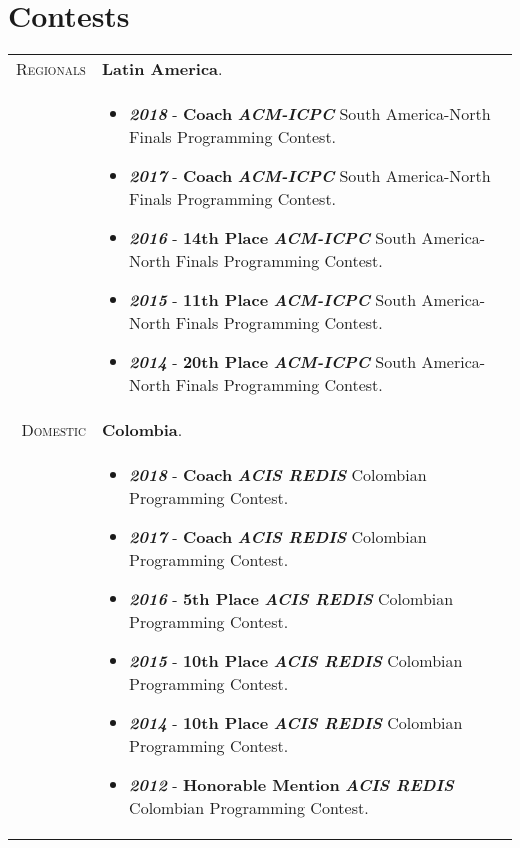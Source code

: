 \documentclass[a4paper,11pt]{article} %
\begin{document}
\section{Contests}
\begin{tabular}{r|p{12cm}}
\textsc{Regionals} & \textbf{Latin America}.\\
\newline
& \footnotesize{
\begin{itemize}
\item \textbf{\textit{2018}}  - \textbf{Coach} \textbf{\emph{ACM-ICPC}} South America-North Finals Programming Contest.
\item \textbf{\textit{2017}}  - \textbf{Coach} \textbf{\emph{ACM-ICPC}} South America-North Finals Programming Contest.
\item \textbf{\textit{2016}}  - \textbf{14th Place} \textbf{\emph{ACM-ICPC}} South America-North Finals Programming Contest.
\item \textbf{\textit{2015}}  - \textbf{11th Place} \textbf{\emph{ACM-ICPC}} South America-North Finals Programming Contest.
\item \textbf{\textit{2014}}  - \textbf{20th Place} \textbf{\emph{ACM-ICPC}} South America-North Finals Programming Contest.
\end{itemize}}\\
\textsc{Domestic} & \textbf{Colombia}.\\
\newline
& \footnotesize{
\begin{itemize}
\item \textbf{\textit{2018}}  - \textbf{Coach} \textbf{\emph{ACIS REDIS}} Colombian Programming Contest.
\item \textbf{\textit{2017}}  - \textbf{Coach} \textbf{\emph{ACIS REDIS}} Colombian Programming Contest.
\item \textbf{\textit{2016}}  - \textbf{5th Place} \textbf{\emph{ACIS REDIS}} Colombian Programming Contest.
\item \textbf{\textit{2015}}  - \textbf{10th Place} \textbf{\emph{ACIS REDIS}} Colombian Programming Contest.
\item \textbf{\textit{2014}}  - \textbf{10th Place} \textbf{\emph{ACIS REDIS}} Colombian Programming Contest.
\item \textbf{\textit{2012}}  - \textbf{Honorable Mention} \textbf{\emph{ACIS REDIS}} Colombian Programming Contest.
\end{itemize}}\\

\end{tabular}
\end{document}
